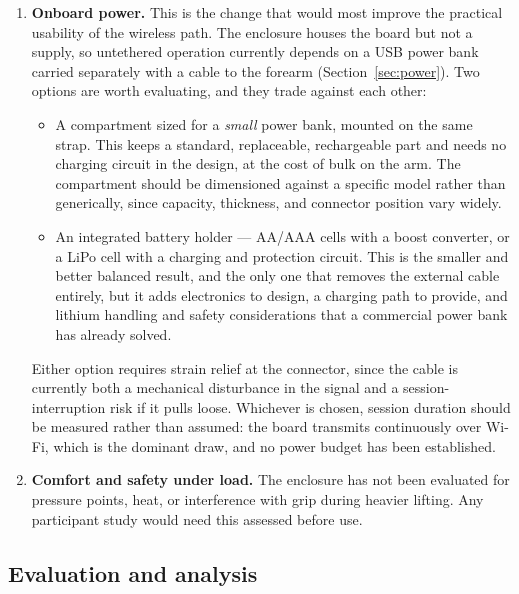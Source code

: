 \documentclass[11pt,a4paper]{article}
\begin{document}
\begin{enumerate}
\item \textbf{Onboard power.} This is the change that would most improve the
practical usability of the wireless path. The enclosure houses the board but not
a supply, so untethered operation currently depends on a USB power bank carried
separately with a cable to the forearm (Section~\ref{sec:power}). Two options
are worth evaluating, and they trade against each other:

\begin{itemize}
\item A compartment sized for a \emph{small} power bank, mounted on the same
strap. This keeps a standard, replaceable, rechargeable part and needs no
charging circuit in the design, at the cost of bulk on the arm. The compartment
should be dimensioned against a specific model rather than generically, since
capacity, thickness, and connector position vary widely.
\item An integrated battery holder --- AA/AAA cells with a boost converter, or a
LiPo cell with a charging and protection circuit. This is the smaller and better
balanced result, and the only one that removes the external cable entirely, but
it adds electronics to design, a charging path to provide, and lithium handling
and safety considerations that a commercial power bank has already solved.
\end{itemize}

Either option requires strain relief at the connector, since the cable is
currently both a mechanical disturbance in the signal and a session-interruption
risk if it pulls loose. Whichever is chosen, session duration should be measured
rather than assumed: the board transmits continuously over Wi-Fi, which is the
dominant draw, and no power budget has been established.

\item \textbf{Comfort and safety under load.} The enclosure has not been
evaluated for pressure points, heat, or interference with grip during heavier
lifting. Any participant study would need this assessed before use.
\end{enumerate}

\subsection{Evaluation and analysis}
\end{document}
